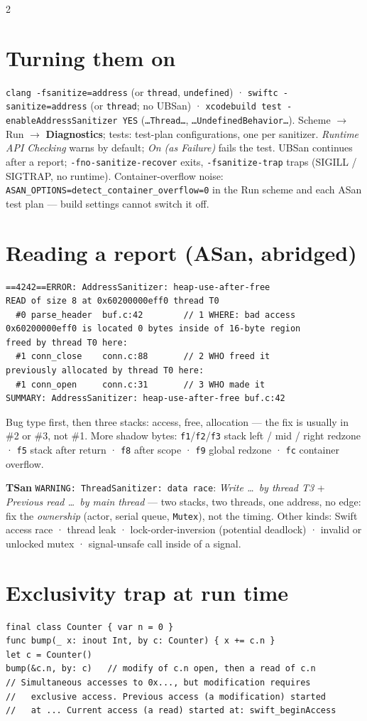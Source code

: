 \documentclass[8pt]{extarticle}
\newcommand\ct[1]{\texttt{#1}}
\begin{document}
\begin{multicols}{2}
\columnbreak

\section{Turning them on}
\ct{clang -fsanitize=address} (or \ct{thread}, \ct{undefined}) · \ct{swiftc -sanitize=address}
(or \ct{thread}; no UBSan) · \ct{xcodebuild test -enableAddressSanitizer YES} (\ct{…Thread…},
\ct{…UndefinedBehavior…}). Scheme $\to$ Run $\to$ \textbf{Diagnostics}; tests: test-plan
configurations, one per sanitizer.
\emph{Runtime API Checking} warns by default; \emph{On (as Failure)} fails the test. UBSan
continues after a report; \ct{-fno-sanitize-recover} exits, \ct{-fsanitize-trap} traps
(SIGILL / SIGTRAP, no runtime). Container-overflow noise:
\ct{ASAN\_OPTIONS=detect\_container\_overflow=0} in the Run scheme and each ASan test plan —
build settings cannot switch it off.

\section{Reading a report {\normalfont\scriptsize(ASan, abridged)}}
\begin{lstlisting}[language=ReportSheet]
==4242==ERROR: AddressSanitizer: heap-use-after-free
READ of size 8 at 0x60200000eff0 thread T0
  #0 parse_header  buf.c:42        // 1 WHERE: bad access
0x60200000eff0 is located 0 bytes inside of 16-byte region
freed by thread T0 here:
  #1 conn_close    conn.c:88       // 2 WHO freed it
previously allocated by thread T0 here:
  #1 conn_open     conn.c:31       // 3 WHO made it
SUMMARY: AddressSanitizer: heap-use-after-free buf.c:42
\end{lstlisting}
Bug type first, then three stacks: access, free, allocation — the fix is usually in \#2 or \#3,
not \#1. More shadow bytes: \ct{f1}/\ct{f2}/\ct{f3} stack left / mid / right redzone · \ct{f5}
stack after return · \ct{f8} after scope · \ct{f9} global redzone · \ct{fc} container overflow.

\textbf{TSan} \ct{WARNING: ThreadSanitizer: data race}: \emph{Write \dots\ by thread T3} +
\emph{Previous read \dots\ by main thread} — two stacks, two threads, one address, no edge: fix the
\emph{ownership} (actor, serial queue, \ct{Mutex}), not the timing. Other kinds: Swift access race ·
thread leak · lock-order-inversion (potential deadlock) · invalid or unlocked mutex ·
signal-unsafe call inside of a signal.

\section{Exclusivity trap at run time}
\begin{lstlisting}[language=SwiftSheet]
final class Counter { var n = 0 }
func bump(_ x: inout Int, by c: Counter) { x += c.n }
let c = Counter()
bump(&c.n, by: c)   // modify of c.n open, then a read of c.n
// Simultaneous accesses to 0x..., but modification requires
//   exclusive access. Previous access (a modification) started
//   at ... Current access (a read) started at: swift_beginAccess
\end{lstlisting}


\end{multicols}
\end{document}
